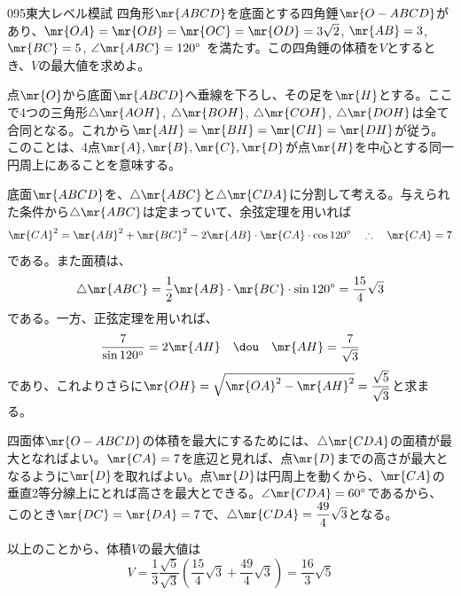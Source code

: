 \begin{prob}{095}{}{東大レベル模試}
 四角形$\mr{ABCD}$を底面とする四角錘$\mr{O-ABCD}$があり、$\mr{OA}=\mr{OB}=\mr{OC}=\mr{OD}=3\sqrt{2}$, $\mr{AB}=3$, $\mr{BC}=5$, $\angle\mr{ABC}=120^\circ$ を満たす。この四角錘の体積を$V$とするとき、$V$の最大値を求めよ。
\end{prob}

点$\mr{O}$から底面$\mr{ABCD}$へ垂線を下ろし、その足を$\mr{H}$とする。ここで4つの三角形$\triangle\mr{AOH}$, $\triangle\mr{BOH}$, $\triangle\mr{COH}$, $\triangle\mr{DOH}$は全て合同となる。これから$\mr{AH}=\mr{BH}=\mr{CH}=\mr{DH}$が従う。このことは、4点$\mr{A}, \mr{B}, \mr{C}, \mr{D}$が点$\mr{H}$を中心とする同一円周上にあることを意味する。

底面$\mr{ABCD}$を、$\triangle\mr{ABC}$と$\triangle\mr{CDA}$に分割して考える。与えられた条件から$\triangle\mr{ABC}$は定まっていて、余弦定理を用いれば
\[ \mr{CA}^2=\mr{AB}^2+\mr{BC}^2-2\mr{AB}\cdot\mr{CA}\cdot\cos 120^\circ \quad\therefore\quad \mr{CA}=7 \]
である。また面積は、
\[ \triangle\mr{ABC}=\frac{1}{2}\mr{AB}\cdot\mr{BC}\cdot\sin 120^\circ=\frac{15}{4}\sqrt{3} \]
である。一方、正弦定理を用いれば、
\[ \frac{7}{\sin 120^\circ}=2\mr{AH} \quad\dou\quad \mr{AH}=\frac{7}{\sqrt{3}} \]
であり、これよりさらに$\mr{OH}=\sqrt{\mr{OA}^2-\mr{AH}^2}=\dfrac{\sqrt{5}}{\sqrt{3}}$と求まる。

四面体$\mr{O-ABCD}$の体積を最大にするためには、$\triangle\mr{CDA}$の面積が最大となればよい。$\mr{CA}=7$を底辺と見れば、点$\mr{D}$までの高さが最大となるように$\mr{D}$を取ればよい。点$\mr{D}$は円周上を動くから、$\mr{CA}$の垂直2等分線上にとれば高さを最大とできる。$\angle\mr{CDA}=60^\circ$であるから、このとき$\mr{DC}=\mr{DA}=7$で、$\triangle\mr{CDA}=\dfrac{49}{4}\sqrt{3}$となる。

以上のことから、体積$V$の最大値は
\[ V=\frac{1}{3}\frac{\sqrt{5}}{\sqrt{3}}\left(\frac{15}{4}\sqrt{3}+\frac{49}{4}\sqrt{3}\right)=\frac{16}{3}\sqrt{5} \]